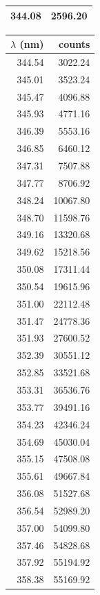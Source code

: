 \begin{table}[!h]
\begin{tabular}{rr}
          344.08 &   2596.20 \\  
\bottomrule
\end{tabular}
\begin{tabular}{rr}
\toprule
 $\lambda$ (nm) &    counts \\
\midrule   
          344.54 &   3022.24 \\
          345.01 &   3523.24 \\
          345.47 &   4096.88 \\
          345.93 &   4771.16 \\
          346.39 &   5553.16 \\
          346.85 &   6460.12 \\
          347.31 &   7507.88 \\
          347.77 &   8706.92 \\
          348.24 &  10067.80 \\
          348.70 &  11598.76 \\
          349.16 &  13320.68 \\
          349.62 &  15218.56 \\
          350.08 &  17311.44 \\
          350.54 &  19615.96 \\
          351.00 &  22112.48 \\
          351.47 &  24778.36 \\
          351.93 &  27600.52 \\
          352.39 &  30551.12 \\
          352.85 &  33521.68 \\
          353.31 &  36536.76 \\
          353.77 &  39491.16 \\
          354.23 &  42346.24 \\
          354.69 &  45030.04 \\
          355.15 &  47508.08 \\
          355.61 &  49667.84 \\
          356.08 &  51527.68 \\
          356.54 &  52989.20 \\
          357.00 &  54099.80 \\
          357.46 &  54828.68 \\
          357.92 &  55194.92 \\
          358.38 &  55169.92 \\ 
\bottomrule
\end{tabular}
\begin{tabular}{rr}

\end{tabular}
\end{table}
